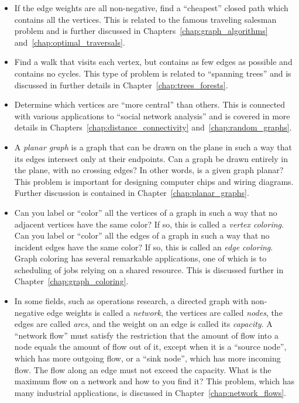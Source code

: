 \begin{itemize}
\item If the edge weights are all non-negative, find a ``cheapest''
  closed path which contains all the vertices. This is related to the
  famous traveling salesman problem and is further discussed in
  Chapters~\ref{chap:graph_algorithms} and~\ref{chap:optimal_traversals}.

\item Find a walk that visits each vertex, but contains as few edges
  as possible and contains no cycles. This type of problem is related
  to ``spanning trees'' and is discussed in further details in
  Chapter~\ref{chap:trees_forests}.

\item Determine which vertices are ``more central'' than others. This
  is connected with various applications to
  ``social network analysis'' and is covered in more details in
  Chapters~\ref{chap:distance_connectivity}
  and~\ref{chap:random_graphs}.

\item A \emph{planar graph} is a graph that can be drawn on the plane
  in such a way that its edges intersect only at their endpoints. Can
  a graph be drawn entirely in the plane, with no crossing edges? In
  other words, is a given graph planar? This problem is important for
  designing computer chips and wiring diagrams. Further discussion is
  contained in Chapter~\ref{chap:planar_graphs}.

\item Can you label or ``color'' all the vertices of a graph in such a
  way that no adjacent vertices have the same color? If so, this is
  called a \emph{vertex coloring}. Can you label or ``color'' all the
  edges of a graph in such a way that no incident edges have the same
  color? If so, this is called an \emph{edge coloring}. Graph coloring
  has several remarkable applications, one of which is to scheduling
  of jobs relying on a shared resource. This is discussed further in
  Chapter~\ref{chap:graph_coloring}.

\item In some fields, such as operations research, a directed graph
  with non-negative edge weights is called a \emph{network}, the
  vertices are called \emph{nodes}, the edges are called \emph{arcs},
  and the weight on an edge is called its \emph{capacity}. A
  ``network flow'' must satisfy the restriction that the amount of
  flow into a node equals the amount of flow out of it, except when it
  is a ``source node'', which has more outgoing flow, or a ``sink
  node'', which has more incoming flow. The flow along an edge must
  not exceed the capacity. What is the maximum flow on a network
  and how to you find it? This problem, which has many industrial
  applications, is discussed in Chapter~\ref{chap:network_flows}.
\end{itemize}


